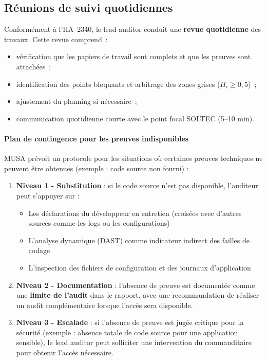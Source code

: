 \documentclass[12pt,a4paper,oneside]{report}
\begin{document}
\subsection{R\'eunions de suivi quotidiennes}

Conform\'ement \`a l'IIA~2340, le lead auditor conduit une \textbf{revue
	quotidienne} des travaux. Cette revue comprend~:

\begin{itemize}[label={\color{gold}}, leftmargin=*, itemsep=2pt]
	\item v\'erification que les papiers de travail sont complets et que les preuves
	sont attach\'ees~;
	\item identification des points bloquants et arbitrage des zones grises ($H_i
	\geq 0{,}5$)~;
	\item ajustement du planning si n\'ecessaire~;
	\item communication quotidienne courte avec le point focal SOLTEC (5--10 min).
\end{itemize}
\paragraph{Plan de contingence pour les preuves indisponibles}

MUSA prévoit un protocole pour les situations où certaines preuves 
techniques ne peuvent être obtenues (exemple : code source non fourni) :

\begin{enumerate}[leftmargin=*, itemsep=4pt]
	\item \textbf{Niveau 1 - Substitution} : si le code source n'est 
	pas disponible, l'auditeur peut s'appuyer sur :
	\begin{itemize}[label={\color{gold}}, leftmargin=*]
		\item Les déclarations du développeur en entretien (croisées 
		avec d'autres sources comme les logs ou les configurations)
		\item L'analyse dynamique (DAST) comme indicateur indirect 
		des failles de codage
		\item L'inspection des fichiers de configuration et des journaux 
		d'application
	\end{itemize}
	
	\item \textbf{Niveau 2 - Documentation} : l'absence de preuve est 
	documentée comme une \textbf{limite de l'audit} dans le rapport, 
	avec une recommandation de réaliser un audit complémentaire 
	lorsque l'accès sera disponible.
	
	\item \textbf{Niveau 3 - Escalade} : si l'absence de preuve est 
	jugée critique pour la sécurité (exemple : absence totale de 
	code source pour une application sensible), le lead auditor 
	peut solliciter une intervention du commanditaire pour obtenir 
	l'accès nécessaire.
\end{enumerate}
\end{document}
